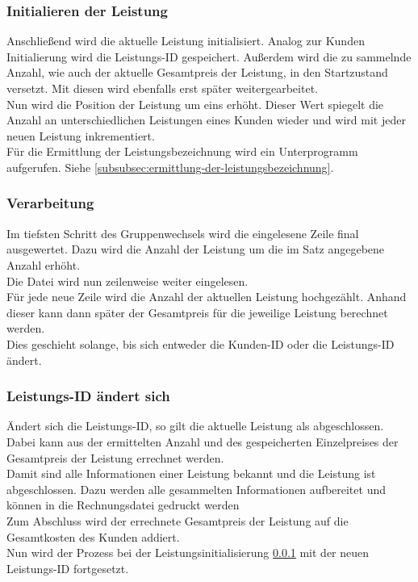 \subsubsection{Initialieren der Leistung}\label{subsubsec:initialisieren-der-leistung}
Anschließend wird die aktuelle Leistung initialisiert. Analog zur Kunden Initialierung wird die Leistungs-ID gespeichert. Außerdem wird die zu sammelnde Anzahl, wie auch der aktuelle Gesamtpreis der Leistung, in den Startzustand versetzt. Mit diesen wird ebenfalls erst später weitergearbeitet.\\
Nun wird die Position der Leistung um eins erhöht. Dieser Wert spiegelt die Anzahl an unterschiedlichen Leistungen eines Kunden wieder und wird mit jeder neuen Leistung inkrementiert.\\
Für die Ermittlung der Leistungsbezeichnung wird ein Unterprogramm aufgerufen. Siehe \ref{subsubsec:ermittlung-der-leistungsbezeichnung}.\\

\subsubsection{Verarbeitung}
Im tiefsten Schritt des Gruppenwechsels wird die eingelesene Zeile final ausgewertet. Dazu wird die Anzahl der Leistung um die im Satz angegebene Anzahl erhöht.\\
Die Datei wird nun zeilenweise weiter eingelesen.\\
Für jede neue Zeile wird die Anzahl der aktuellen Leistung hochgezählt. Anhand dieser kann dann später der Gesamtpreis für die jeweilige Leistung berechnet werden.\\
Dies geschieht solange, bis sich entweder die Kunden-ID oder die Leistungs-ID ändert.

\subsubsection{Leistungs-ID ändert sich}\label{subsubsec:leistungs-id-aendert-sich}
Ändert sich die Leistungs-ID, so gilt die aktuelle Leistung als abgeschlossen. Dabei kann aus der ermittelten Anzahl und des gespeicherten Einzelpreises der Gesamtpreis der Leistung errechnet werden.\\
Damit sind alle Informationen einer Leistung bekannt und die Leistung ist abgeschlossen. Dazu werden alle gesammelten Informationen aufbereitet und können in die Rechnungsdatei gedruckt werden\\
Zum Abschluss wird der errechnete Gesamtpreis der Leistung auf die Gesamtkosten des Kunden addiert.\\
Nun wird der Prozess bei der Leistungsinitialisierung \ref{subsubsec:initialisieren-der-leistung} mit der neuen Leistungs-ID fortgesetzt.\\

